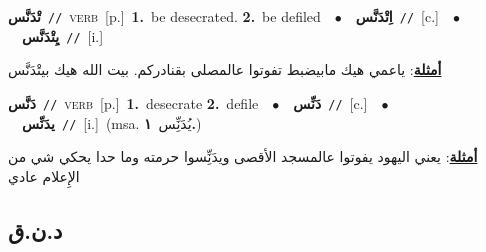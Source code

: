 \documentclass[10pt,a4paper,twoside]{article} %
\begin{document}
\begin{multicols}{2}
{\setlength\topsep{0pt}\textbf{\foreignlanguage{arabic}{تْدَنَّس}}\ {\color{gray}\texttt{//}\color{black}}\ \textsc{verb}\ [p.]\ \textbf{1.}~be desecrated.  \textbf{2.}~be defiled\ \ $\bullet$\ \ \setlength\topsep{0pt}\textbf{\foreignlanguage{arabic}{اِتْدَنَّس}}\ {\color{gray}\texttt{//}\color{black}}\ [c.]\ \ $\bullet$\ \ \setlength\topsep{0pt}\textbf{\foreignlanguage{arabic}{يِتْدَنَّس}}\ {\color{gray}\texttt{//}\color{black}}\ [i.]\  \begin{flushright}\color{gray}\foreignlanguage{arabic}{\textbf{\underline{\foreignlanguage{arabic}{أمثلة}}}: ياعمي هيك مابيضبط تفوتوا عالمصلى بقنادركم. بيت الله هيك بيتْدَنَّس}\end{flushright}\color{black}} \vspace{2mm}

{\setlength\topsep{0pt}\textbf{\foreignlanguage{arabic}{دَنَّس}}\ {\color{gray}\texttt{//}\color{black}}\ \textsc{verb}\ [p.]\ \textbf{1.}~desecrate  \textbf{2.}~defile\ \ $\bullet$\ \ \setlength\topsep{0pt}\textbf{\foreignlanguage{arabic}{دَنِّس}}\ {\color{gray}\texttt{//}\color{black}}\ [c.]\ \ $\bullet$\ \ \setlength\topsep{0pt}\textbf{\foreignlanguage{arabic}{يدَنِّس}}\ {\color{gray}\texttt{//}\color{black}}\ [i.]\ \color{gray}(msa. \foreignlanguage{arabic}{يُدَنِِّس}~\foreignlanguage{arabic}{\textbf{١.}})\color{black}\  \begin{flushright}\color{gray}\foreignlanguage{arabic}{\textbf{\underline{\foreignlanguage{arabic}{أمثلة}}}: يعني اليهود يفوتوا عالمسجد الأقصى ويدَنِِّسوا حرمته وما حدا يحكي شي من الإِعلام عادي}\end{flushright}\color{black}} \vspace{2mm}

\vspace{-3mm}
\subsection*{\color{blue}\foreignlanguage{arabic}{د.ن.ق}\color{blue}{}} 


\end{multicols}
\end{document}
